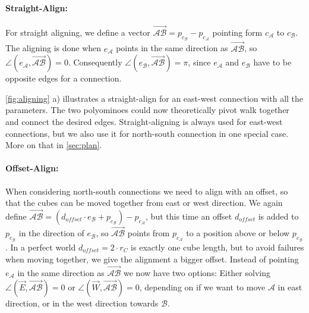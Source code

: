 \paragraph{Straight-Align:}

For straight aligning, we define a vector $\overrightarrow{\mathcal{A}\mathcal{B}} = p_{c_\mathcal{B}} - p_{c_\mathcal{A}}$ pointing form $c_\mathcal{A}$ to $c_\mathcal{B}$.
The aligning is done when $e_\mathcal{A}$ points in the same direction as $\overrightarrow{\mathcal{A}\mathcal{B}}$, so $\angle \left( e_\mathcal{A}, \overrightarrow{\mathcal{A}\mathcal{B}} \right) = 0$.
Consequently $\angle \left( e_\mathcal{B}, \overrightarrow{\mathcal{A}\mathcal{B}} \right) = \pi$, since $e_\mathcal{A}$ and $e_\mathcal{B}$ have to be opposite edges for a connection.

\autoref{fig:aligning} a) illustrates a straight-align for an east-west connection with all the parameters.
The two polyominoes could now theoretically pivot walk together and connect the desired edges.
Straight-aligning is always used for east-west connections, but we also use it for north-south connection in one special case. More on that in \autoref{sec:plan}.

\paragraph{Offset-Align:}

When considering north-south connections we need to align with an offset, so that the cubes can be moved together from east or west direction.
We again define $\overrightarrow{\mathcal{A}\mathcal{B}} = \left( d_\textit{offset} \cdot e_\mathcal{B} + p_{c_\mathcal{B}} \right) - p_{c_\mathcal{A}}$, but this time an offset $d_\textit{offset}$ is added to $p_{c_\mathcal{B}}$ in the direction of $e_\mathcal{B}$, so $\overrightarrow{\mathcal{A}\mathcal{B}}$ points from $p_{c_\mathcal{A}}$ to a position above or below $p_{c_\mathcal{B}}$.
In a perfect world $d_\textit{offset} = 2 \cdot r_C$ is exactly one cube length, but to avoid failures when moving together, we give the alignment a bigger offset.
Instead of pointing $e_\mathcal{A}$ in the same direction as $\overrightarrow{\mathcal{A}\mathcal{B}}$ we now have two options:
Either solving $\angle \left( \vec{E}, \overrightarrow{\mathcal{A}\mathcal{B}} \right) = 0$ or $\angle \left( \vec{W}, \overrightarrow{\mathcal{A}\mathcal{B}} \right) = 0$, depending on if we want to move $\mathcal{A}$ in east direction, or in the west direction towards $\mathcal{B}$.

